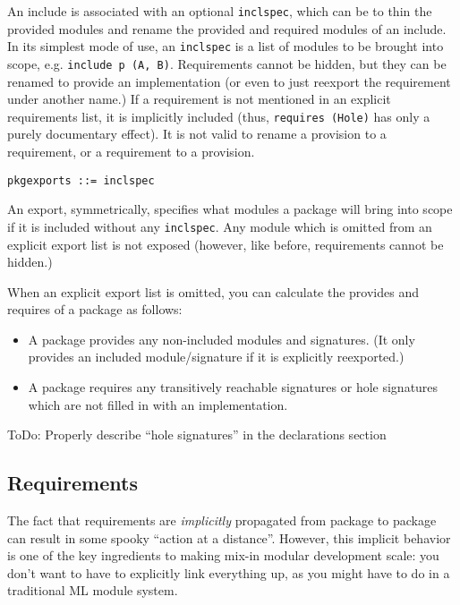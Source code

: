 \documentclass{article}
\newcommand{\Red}[1]{{\color{red} #1}}
\begin{document}
An include is associated with an optional \verb|inclspec|,
which can be to thin the provided modules and rename the provided and
required modules of an include.  In its simplest mode of use,
an \verb|inclspec| is a list of modules to be brought into scope,
e.g. \verb|include p (A, B)|.  Requirements cannot be hidden, but
they can be renamed to provide an implementation (or even to just
reexport the requirement under another name.)  If a requirement is
not mentioned in an explicit requirements list, it is implicitly included
(thus, \verb|requires (Hole)| has only a purely documentary effect).
It is not valid to rename a provision to a requirement, or a requirement
to a provision.

\begin{verbatim}
pkgexports ::= inclspec
\end{verbatim}

An export, symmetrically, specifies what modules a package will bring
into scope if it is included without any \verb|inclspec|.  Any module
which is omitted from an explicit export list is not exposed (however,
like before, requirements cannot be hidden.)

When an explicit export list is omitted, you can calculate the provides
and requires of a package as follows:

\begin{itemize}
    \item A package provides any non-included modules and signatures.
        (It only provides an included module/signature if it is explicitly
        reexported.)
    \item A package requires any transitively reachable signatures or
        hole signatures which are not filled in with an implementation.
\end{itemize}

\Red{ToDo: Properly describe ``hole signatures'' in the declarations section}

\subsection{Requirements}

The fact that requirements are \emph{implicitly} propagated from package
to package can result in some spooky ``action at a distance''. However,
this implicit behavior is one of the key ingredients to making mix-in
modular development scale: you don't want to have to explicitly link
everything up, as you might have to do in a traditional ML module
system.
\end{document}
